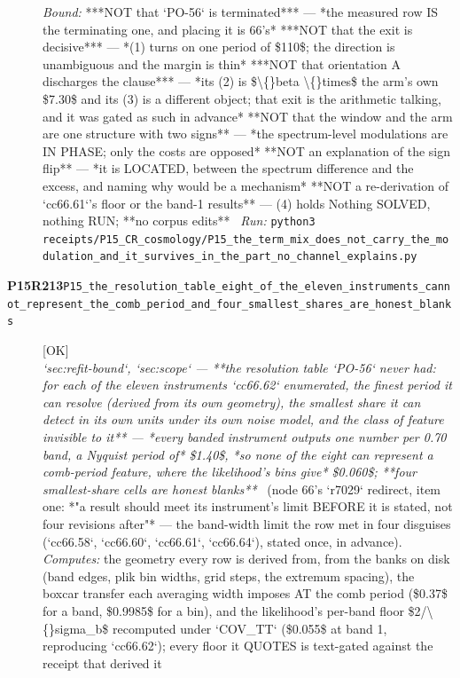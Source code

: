 \begin{description}
 \emph{Bound:}  ***NOT that `PO-56` is terminated*** --- *the measured row IS the terminating one, and placing it is 66's*  ***NOT that the exit is decisive*** --- *(1) turns on one period of \$110\$; the direction is unambiguous and the margin is thin*  ***NOT that orientation A discharges the clause*** --- *its (2) is \$\textbackslash\{\}beta \textbackslash\{\}times\$ the arm's own \$7.30\$ and its (3) is a different object; that exit is the arithmetic talking, and it was gated as such in advance*  **NOT that the window and the arm are one structure with two signs** --- *the spectrum-level modulations are IN PHASE; only the costs are opposed*  **NOT an explanation of the sign flip** --- *it is LOCATED, between the spectrum difference and the excess, and naming why would be a mechanism*  **NOT a re-derivation of `cc66.61`'s floor or the band-1 results** --- (4) holds  Nothing SOLVED, nothing RUN; **no corpus edits**
\ \emph{Run:} \texttt{python3 receipts/P15\_CR\_cosmology/P15\_the\_term\_mix\_does\_not\_carry\_the\_modulation\_and\_it\_survives\_in\_the\_part\_no\_channel\_explains.py}
\item[\rcptlabel{P15_the_resolution_table_eight_of_the_eleven_instruments_cannot_represent_the_comb_period_and_four_smallest_shares_are_honest_blanks}{P15R213}\textbf{P15R213}\quad\texttt{P15\_the\_resolution\_table\_eight\_of\_the\_eleven\_instruments\_cannot\_represent\_the\_comb\_period\_and\_four\_smallest\_shares\_are\_honest\_blanks}]\hfill\textsf{[OK]}\\
\textit{`sec:refit-bound`, `sec:scope` --- **the resolution table `PO-56` never had: for each of the eleven instruments `cc66.62` enumerated, the finest period it can resolve (derived from its own geometry), the smallest share it can detect in its own units under its own noise model, and the class of feature invisible to it** --- *every banded instrument outputs one number per 0.70 band, a Nyquist period of* \$1.40\$, *so none of the eight can represent a comb-period feature, where the likelihood's bins give* \$0.060\$; **four smallest-share cells are honest blanks**} \ (node 66's `r7029` redirect, item one: *"a result should meet its instrument's limit BEFORE it is stated, not four revisions after"* --- the band-width limit the row met in four disguises (`cc66.58`, `cc66.60`, `cc66.61`, `cc66.64`), stated once, in advance). 
\emph{Computes:} the geometry every row is derived from, from the banks on disk (band edges, plik bin widths, grid steps, the extremum spacing), the boxcar transfer each averaging width imposes AT the comb period (\$0.37\$ for a band, \$0.9985\$ for a bin), and the likelihood's per-band floor \$2/\textbackslash\{\}sigma\_b\$ recomputed under `COV\_TT` (\$0.055\$ at band 1, reproducing `cc66.62`); every floor it QUOTES is text-gated against the receipt that derived it

\end{description}
